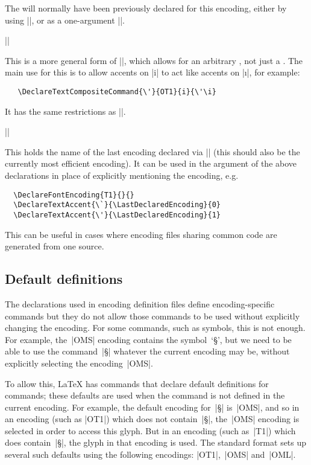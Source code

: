 \documentclass{ltxguide}[1995/11/28]
\begin{document}
The  will normally have been previously declared
for this encoding, either by using
|\DeclareTextAccent|, or as a one-argument |\DeclareTextCommand|.
 
\begin{decl}[1994/12/01]
   |\DeclareTextCompositeCommand|   
\end{decl}
This is a more general form of |\DeclareTextComposite|, which allows
for an arbitrary , not just a .  The main use
for this is to allow accents on |i| to act like accents on |\i|, for
example:
\begin{verbatim}
   \DeclareTextCompositeCommand{\'}{OT1}{i}{\'\i}
\end{verbatim}
It has the same restrictions as |\DeclareTextComposite|.


\begin{decl}[1998/12/01]
   |\LastDeclaredEncoding|
\end{decl}
This holds the name of the last encoding declared via
|\DeclareFontEncoding| (this should also be the currently most
efficient encoding).  It can be used in the  argument
of the above declarations in place of explicitly mentioning the
encoding, e.g.
\begin{verbatim}
  \DeclareFontEncoding{T1}{}{}
  \DeclareTextAccent{\`}{\LastDeclaredEncoding}{0}
  \DeclareTextAccent{\'}{\LastDeclaredEncoding}{1}
\end{verbatim}
This can be useful in cases where encoding files sharing common code
are generated from one source.  


\subsection{Default definitions}
 
The declarations used in encoding definition files define
encoding-specific commands but they do not allow those commands to be
used without explicitly changing the encoding.  For some commands,
such as symbols, this is not enough.  For example, the~|OMS| encoding
contains the symbol~`\S', but we need to be able to use the
command~|\S| whatever the current encoding may be, without explicitly
selecting the encoding~|OMS|.
   
To allow this, \LaTeX{} has commands that declare default definitions
for commands; these defaults are used when the command is not defined
in the current encoding.  For example, the default encoding for~|\S|
is~|OMS|, and so in an encoding (such as |OT1|) which does not
contain~|\S|, the~|OMS| encoding is selected in order to access this
glyph.  But in an encoding (such as~|T1|) which does contain~|\S|, the
glyph in that encoding is used.  The standard \LaTeXe{} format sets
up several such defaults using the following encodings: |OT1|,~|OMS|
and~|OML|.
\end{document}
